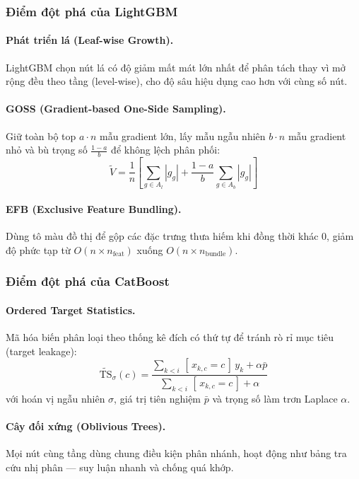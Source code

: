 \documentclass[12pt,a4paper]{report}
\begin{document}
\subsubsection{Điểm đột phá của LightGBM}
\paragraph{Phát triển lá (Leaf-wise Growth).}
LightGBM chọn nút lá có độ giảm mất mát lớn nhất để phân tách thay vì mở rộng đều theo tầng (level-wise), cho độ sâu hiệu dụng cao hơn với cùng số nút.

\paragraph{GOSS (Gradient-based One-Side Sampling).}
Giữ toàn bộ top $a\cdot n$ mẫu gradient lớn, lấy mẫu ngẫu nhiên $b\cdot n$ mẫu gradient nhỏ và bù trọng số $\frac{1-a}{b}$ để không lệch phân phối:
\[
    \tilde{V} = \frac{1}{n}\left[\sum_{g \in A_l}|g_g| + \frac{1-a}{b}\sum_{g \in A_b}|g_g|\right]
\]

\paragraph{EFB (Exclusive Feature Bundling).}
Dùng tô màu đồ thị để gộp các đặc trưng thưa hiếm khi đồng thời khác 0, giảm độ phức tạp từ $O(n \times n_{\mathrm{feat}})$ xuống $O(n \times n_{\mathrm{bundle}})$.

\subsubsection{Điểm đột phá của CatBoost}
\paragraph{Ordered Target Statistics.}
Mã hóa biến phân loại theo thống kê đích có thứ tự để tránh rò rỉ mục tiêu (target leakage):
\[
    \widetilde{\mathrm{TS}}_\sigma(c) = \frac{\sum_{k<i}\,[\,x_{k,c}=c\,]\,y_k + \alpha \bar{p}}{\sum_{k<i}\,[\,x_{k,c}=c\,] + \alpha}
\]
với hoán vị ngẫu nhiên $\sigma$, giá trị tiên nghiệm $\bar{p}$ và trọng số làm trơn Laplace $\alpha$.

\paragraph{Cây đối xứng (Oblivious Trees).}
Mọi nút cùng tầng dùng chung điều kiện phân nhánh, hoạt động như bảng tra cứu nhị phân --- suy luận nhanh và chống quá khớp.
\end{document}
